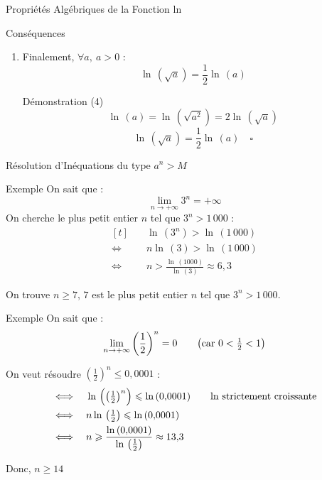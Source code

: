 \documentclass{cours}
\begin{document}
\begin{Gpartie}{Propriétés Algébriques de la Fonction ln}
\begin{Spartie}{Conséquences}
\begin{enumerate}[(1)]
\begin{SSpartie}{Démonstration (3)}
                \end{SSpartie}
                \item Finalement, $\forall a,~a>0$ :
                \[\ln\,\left(\sqrt{a}\right)=\frac{1}{2}\ln\,(a)\]
                \begin{SSpartie}{Démonstration (4)}
                    \[\ln\,(a)=\ln\,\left(\sqrt{a^2}\right)=2\ln\,\left(\sqrt{a}\right)\]
                    \[\ln\,\left(\sqrt{a}\right)=\frac{1}{2}\ln\,(a)\quad\square\]

                \end{SSpartie}
            \end{enumerate}
        \end{Spartie}
    \end{Gpartie}
    \begin{Gpartie}{Résolution d'Inéquations du type $a^n>M$}
        \vspace{-2ex}
        \begin{Spartie}{Exemple}
            On sait que : \[\lim_{n\to+\infty}3^n=+\infty\]
            On cherche le plus petit entier $n$ tel que $3^n>1\,000$ :
            \[\begin{aligned}[t]
                &\quad\ln\,\left(3^n\right)>\ln\,(1\,000) \\
                \iff&\quad n\ln\,(3)>\ln\,(1\,000) \\
                \iff&\quad n>\frac{\ln\,(1000)}{\ln\,(3)}\approx 6{,}3
            \end{aligned}\]

            On trouve $n\geq 7$, $7$ est le plus petit entier $n$ tel que $3^n>1\,000$.
        \end{Spartie}
        \vspace{-2ex}
        \begin{Spartie}{Exemple}
            On sait que : \[\lim_{n\to+\infty}\left(\frac{1}{2}\right)^n=0\text{\qquad \big(car $0<\tfrac{1}{2}<1$\big)}\]
            
            On veut résoudre $\left(\frac{1}{2}\right)^n\leq 0{,}0001$ :
            \[\begin{aligned}[t]
                \iff&\quad\ln\,\Big(\big(\tfrac{1}{2}\big)^n\Big)\leq\ln\,(0{,}0001)\text{\qquad $\ln$ strictement croissante} \\
                \iff&\quad n\ln\,\big(\tfrac{1}{2}\big)\leq\ln\,(0{,}0001) \\
                \iff&\quad n\geq\frac{\ln\,(0{,}0001)}{\ln\,\left(\frac{1}{2}\right)}\approx13{,}3
            \end{aligned}\]

            Donc, $n\geq 14$
        \end{Spartie}
    \end{Gpartie}
\end{document}

